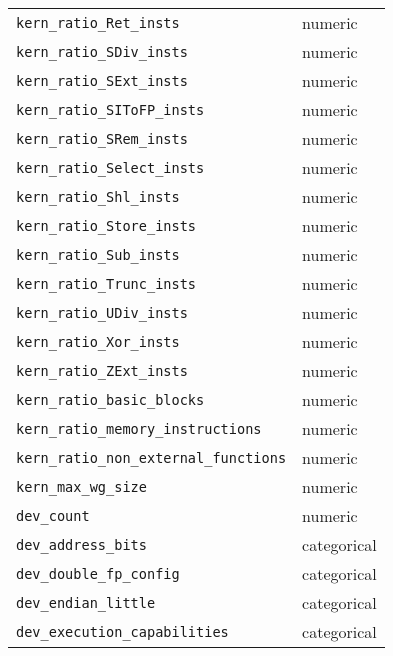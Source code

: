 \begin{tabular}{ll}
  \texttt{kern\_ratio\_Ret\_insts} & numeric \\
  \texttt{kern\_ratio\_SDiv\_insts} & numeric \\
  \texttt{kern\_ratio\_SExt\_insts} & numeric \\
  \texttt{kern\_ratio\_SIToFP\_insts} & numeric \\
  \texttt{kern\_ratio\_SRem\_insts} & numeric \\
  \texttt{kern\_ratio\_Select\_insts} & numeric \\
  \texttt{kern\_ratio\_Shl\_insts} & numeric \\
  \texttt{kern\_ratio\_Store\_insts} & numeric \\
  \texttt{kern\_ratio\_Sub\_insts} & numeric \\
  \texttt{kern\_ratio\_Trunc\_insts} & numeric \\
  \texttt{kern\_ratio\_UDiv\_insts} & numeric \\
  \texttt{kern\_ratio\_Xor\_insts} & numeric \\
  \texttt{kern\_ratio\_ZExt\_insts} & numeric \\
  \texttt{kern\_ratio\_basic\_blocks} & numeric \\
  \texttt{kern\_ratio\_memory\_instructions} & numeric \\
  \texttt{kern\_ratio\_non\_external\_functions} & numeric \\
  \texttt{kern\_max\_wg\_size} & numeric \\
  \texttt{dev\_count} & numeric \\
  \texttt{dev\_address\_bits} & categorical \\
  \texttt{dev\_double\_fp\_config} & categorical \\
  \texttt{dev\_endian\_little} & categorical \\
  \texttt{dev\_execution\_capabilities} & categorical \\
  \bottomrule
\end{tabular}

